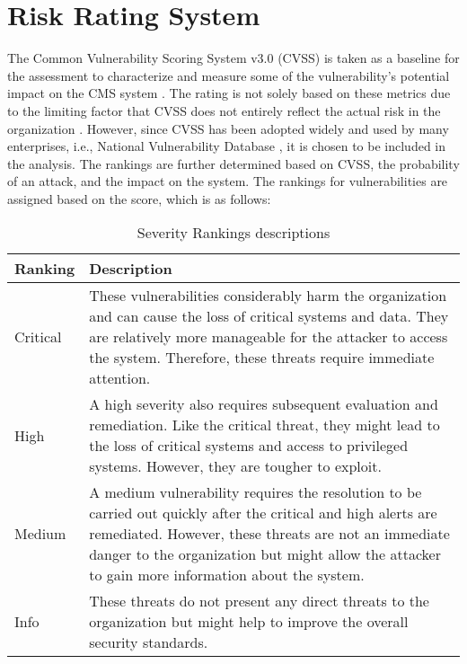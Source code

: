 \chapter{Risk Rating System}

The Common Vulnerability Scoring System v3.0 (CVSS) is taken as a baseline for the assessment to characterize and measure some of the vulnerability's potential impact on the CMS system \citep[p.~516]{cvss}. 
The rating is not solely based on these metrics due to the limiting factor that CVSS does not entirely reflect the actual risk in the organization \citep[p.~7]{limitations_cvss}. However, since CVSS has been adopted widely and used by many enterprises, i.e., National Vulnerability Database \citep{nist}, it is chosen to be included in the analysis. The rankings are further determined based on CVSS, the probability of an attack, and the impact on the system.
The rankings for vulnerabilities are assigned based on the score, which is as follows:


\begingroup
\centering
\setlength{\tabcolsep}{6.5pt} %
\renewcommand{\arraystretch}{1.8} %
\begin{longtable}{ |p{5cm}| p{10cm} |}
\caption{Severity Rankings descriptions}
    \label{table:spoofing}
\hline
\rowcolor{grey!15}
\textbf{Ranking}  & \textbf{Description}\\
\hline
\cellcolor{red!95} Critical  & These vulnerabilities considerably harm the organization and can cause the loss of critical systems and data. They are relatively more manageable for the attacker to access the system. Therefore, these threats require immediate attention.\\
\hline
\cellcolor{red!70} High  &  A high severity also requires subsequent evaluation and remediation. Like the critical threat, they might lead to the loss of critical systems and access to privileged systems. However, they are tougher to exploit.\\
\hline
\hline
\cellcolor{yellow!95} Medium &  A medium vulnerability requires the resolution to be carried out quickly after the critical and high alerts are remediated. However, these threats are not an immediate danger to the organization but might allow the attacker to gain more information about the system.\\
\hline
\cellcolor{grey!55} Info  &  These threats do not present any direct threats to the organization but might help to improve the overall security standards.\\
\hline
\end{longtable}
\endgroup